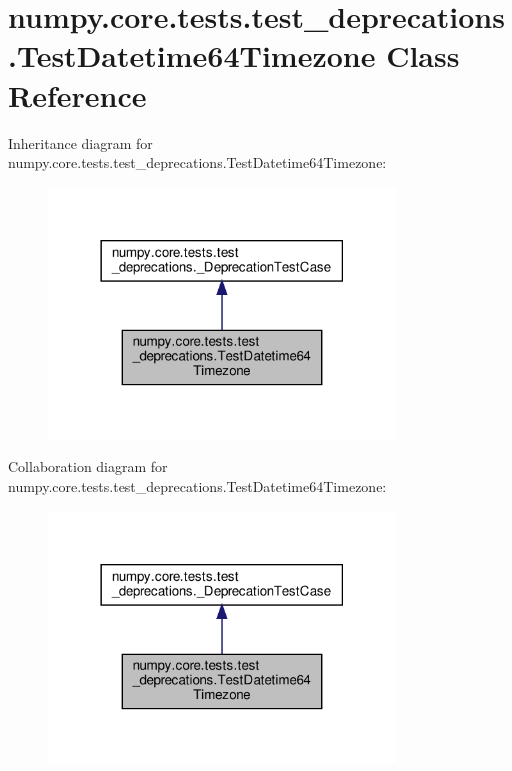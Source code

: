 \hypertarget{classnumpy_1_1core_1_1tests_1_1test__deprecations_1_1TestDatetime64Timezone}{}\section{numpy.\+core.\+tests.\+test\+\_\+deprecations.\+Test\+Datetime64\+Timezone Class Reference}
\label{classnumpy_1_1core_1_1tests_1_1test__deprecations_1_1TestDatetime64Timezone}


Inheritance diagram for numpy.\+core.\+tests.\+test\+\_\+deprecations.\+Test\+Datetime64\+Timezone\+:
\nopagebreak
\begin{figure}[H]
\begin{center}
\leavevmode
\includegraphics[width=261pt]{classnumpy_1_1core_1_1tests_1_1test__deprecations_1_1TestDatetime64Timezone__inherit__graph}
\end{center}
\end{figure}


Collaboration diagram for numpy.\+core.\+tests.\+test\+\_\+deprecations.\+Test\+Datetime64\+Timezone\+:
\nopagebreak
\begin{figure}[H]
\begin{center}
\leavevmode
\includegraphics[width=261pt]{classnumpy_1_1core_1_1tests_1_1test__deprecations_1_1TestDatetime64Timezone__coll__graph}
\end{center}
\end{figure}
